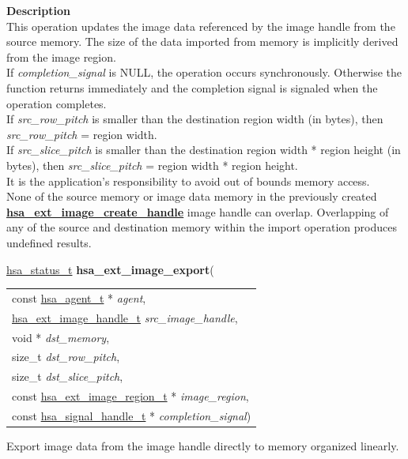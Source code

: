 \documentclass[final]{book}
\newcommand{\hsaarg}[1]{\textit{#1}}
\newcommand{\reffun}[1]{\textbf{#1}}
\begin{document}
\vspace{-4mm}\noindent\textbf{Description}\\[1mm]
This operation updates the image data referenced by the image handle from the source memory. The size of the data imported from memory is implicitly derived from the image region.\\[2mm]
If \textit{completion_signal} is NULL, the operation occurs synchronously. Otherwise the function returns immediately and the completion signal is signaled when the operation completes.\\[2mm]
If \textit{src_row_pitch} is smaller than the destination region width (in bytes), then \textit{src_row_pitch} = region width.\\[2mm]
If \textit{src_slice_pitch} is smaller than the destination region width * region height (in bytes), then \textit{src_slice_pitch} = region width * region height.\\[2mm]
It is the application's responsibility to avoid out of bounds memory access.\\[2mm]
None of the source memory or image data memory in the previously created \hyperlink{group__images_1gaab643889d22ca4ea75ab16968c15c877}{\reffun{hsa_ext_image_create_handle}} image handle can overlap. Overlapping of any of the source and destination memory within the import operation produces undefined results. 


\noindent\begin{tcolorbox}[breakable,nobeforeafter,colframe=white,colback=lightgray,left=0mm]
\hyperlink{group__status_1gad755322e7ff95456520e8abdbe90d225}{hsa_status_t} \hypertarget{group__images_1ga313cb4b78cd3dd110a3061f4bdaffa9d}{\textbf{hsa_ext_image_export}}(
\vspace{-3.5mm}\begin{longtable}{@{}p{\textwidth}}
\hspace{1.7em}const \hyperlink{group__topology_1gab8db3fb886332a24acac08ec361e1d86}{hsa_agent_t} * \hsaarg{agent},\\
\hspace{1.7em}\hyperlink{group__images_1gae59456dc07140b58a2d526bcf01d2d88}{hsa_ext_image_handle_t} \hsaarg{src_image_handle},\\
\hspace{1.7em}void * \hsaarg{dst_memory},\\
\hspace{1.7em}size_t \hsaarg{dst_row_pitch},\\
\hspace{1.7em}size_t \hsaarg{dst_slice_pitch},\\
\hspace{1.7em}const \hyperlink{group__images_1gada3adaf96ca2ddac605280cae6470b73}{hsa_ext_image_region_t} * \hsaarg{image_region},\\
\hspace{1.7em}const \hyperlink{group__signals_1ga6592c136d70853d855bc11d9efdbf534}{hsa_signal_handle_t} * \hsaarg{completion_signal})\end{longtable}

\end{tcolorbox}
Export image data from the image handle directly to memory organized linearly.
\end{document}
